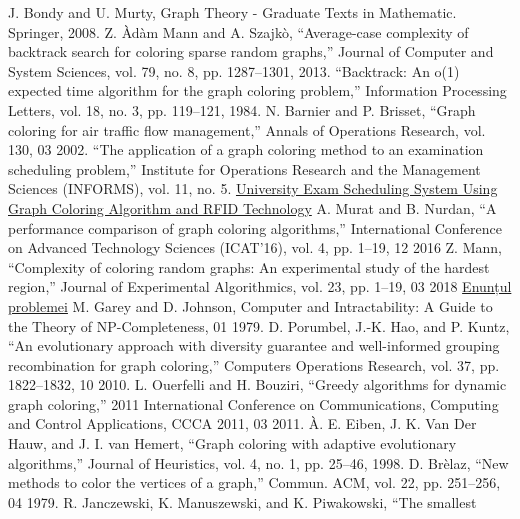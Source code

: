 \documentclass[runningheads]{paper}
\begin{document}
\begin{thebibliography}{8}

    J. Bondy and U. Murty, Graph Theory - Graduate Texts in Mathematic.
    Springer, 2008.
    Z. \`{A}d\`{a}m Mann and A. Szajk\`{o}, “Average-case complexity of backtrack
    search for coloring sparse random graphs,” Journal of Computer and
    System Sciences, vol. 79, no. 8, pp. 1287–1301, 2013.
    “Backtrack: An o(1) expected time algorithm for the graph coloring
    problem,” Information Processing Letters, vol. 18, no. 3, pp. 119–121,
    1984.
    N. Barnier and P. Brisset, “Graph coloring for air traffic flow management,” 
    Annals of Operations Research, vol. 130, 03 2002.
    “The application of a graph coloring method to an examination scheduling problem,” 
    Institute for Operations Research and the Management
    Sciences (INFORMS), vol. 11, no. 5.
    \href{http://www.ijimt.org/papers/359-D0129.pdf}{University Exam Scheduling System Using Graph
    Coloring Algorithm and RFID Technology}
    A. Murat and B. Nurdan, “A performance comparison of graph coloring algorithms,” 
    International Conference on Advanced Technology
    Sciences (ICAT’16), vol. 4, pp. 1–19, 12 2016
    Z. Mann, “Complexity of coloring random graphs: An experimental
    study of the hardest region,” Journal of Experimental Algorithmics,
    vol. 23, pp. 1–19, 03 2018
    \href{https://acs-aa-challenge.github.io/acs-aa-challenge/18-np-2-colouring/}{Enunțul problemei}
    M. Garey and D. Johnson, Computer and Intractability: A Guide to the
    Theory of NP-Completeness, 01 1979.
    D. Porumbel, J.-K. Hao, and P. Kuntz, “An evolutionary approach with
    diversity guarantee and well-informed grouping recombination for graph
    coloring,” Computers Operations Research, vol. 37, pp. 1822–1832, 10
    2010.
    L. Ouerfelli and H. Bouziri, “Greedy algorithms for dynamic graph coloring,” 2011 International Conference on Communications, Computing
    and Control Applications, CCCA 2011, 03 2011.
    \`{A}. E. Eiben, J. K. Van Der Hauw, and J. I. van Hemert, “Graph coloring
    with adaptive evolutionary algorithms,” Journal of Heuristics, vol. 4,
    no. 1, pp. 25–46, 1998.
    D. Br\`{e}laz, “New methods to color the vertices of a graph,”  Commun.
    ACM, vol. 22, pp. 251–256, 04 1979.
    R. Janczewski, K. Manuszewski, and K. Piwakowski, “The smallest

\end{thebibliography}
\end{document}
